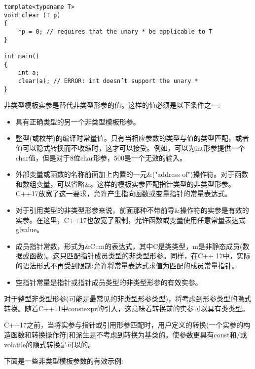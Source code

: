 \begin{lstlisting}[style=styleCXX]
template<typename T>
void clear (T p)
{
	*p = 0; // requires that the unary * be applicable to T
}

int main()
{
	int a;
	clear(a); // ERROR: int doesn’t support the unary *
}
\end{lstlisting}


非类型模板实参是替代非类型形参的值。这样的值必须是以下条件之一:

\begin{itemize}
\item 
具有正确类型的另一个非类型模板形参。

\item
整型(或枚举)的编译时常量值。只有当相应参数的类型与值的类型匹配，或者值可以隐式转换而不收缩时，这才可以接受。例如，可以为int形参提供一个char值，但是对于8位char形参，500是一个无效的输入。

\item 
外部变量或函数的名称前面加上内置的一元\&("address of")操作符。对于函数和数组变量，可以省略\&。这样的模板实参匹配指针类型的非类型形参。C++17放宽了这一要求，允许产生指向函数或变量指针的常量表达式。

\item 
对于引用类型的非类型形参来说，前面那种不带前导\&操作符的实参是有效的实参。在这里，C++17也放宽了限制，允许函数或变量使用任意常量表达式glvalue。

\item 
成员指针常数，形式为\&C::m的表达式，其中C是类类型，m是非静态成员(数据或函数)。这只匹配指针成员类型的非类型形参。同样，在C++ 17中，实际的语法形式不再受到限制:允许将常量表达式求值为匹配的成员常量指针。

\item 
空指针常量是指针或指针成员类型的非类型形参的有效实参。
\end{itemize}

对于整型非类型形参(可能是最常见的非类型形参类型)，将考虑到形参类型的隐式转换。随着C++11中constexpr的引入，这意味着转换前的实参可以具有类类型。

C++17之前，当将实参与指针或引用形参匹配时，用户定义的转换(一个实参的构造函数和转换操作符)和派生是不考虑到转换为基类的。使参数更具有const和/或volatile的隐式转换是可以的。

下面是一些非类型模板参数的有效示例:

